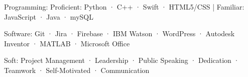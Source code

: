 
\begin{cvskills}
\cvskill
    {Programming:} %
    {Proficient: Python  ·  C++  ·  Swift  ·  HTML5/CSS  |  Familiar:  JavaScript  ·  Java  ·  mySQL} %

  \cvskill
    {Software:} %
    {Git · Jira · Firebase · IBM Watson · WordPress · Autodesk Inventor · MATLAB · Microsoft Office} %

  \cvskill
    {Soft:} %
    {Project Management · Leadership · Public Speaking · Dedication · Teamwork · Self-Motivated · Communication} %
\end{cvskills}
